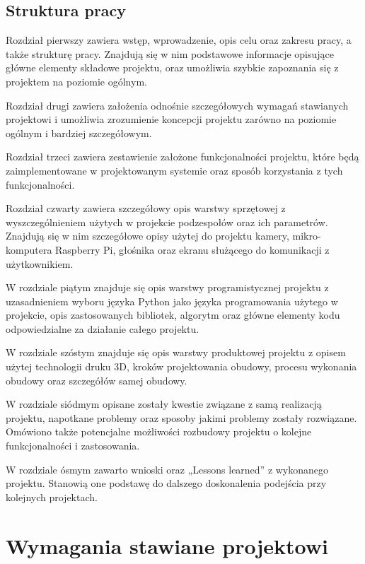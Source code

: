 \documentclass[a4paper,12pt,reqno]{article}
\begin{document}
\subsection{Struktura pracy} %

Rozdział pierwszy zawiera wstęp, wprowadzenie, opis celu oraz zakresu pracy, a także strukturę pracy. Znajdują się w nim podstawowe informacje opisujące główne elementy składowe projektu, oraz umożliwia szybkie zapoznania się z projektem na poziomie ogólnym.

Rozdział drugi zawiera założenia odnośnie szczegółowych wymagań stawianych projektowi i umożliwia zrozumienie koncepcji projektu zarówno na poziomie ogólnym i bardziej szczegółowym.

Rozdział trzeci zawiera zestawienie założone funkcjonalności projektu, które będą zaimplementowane w projektowanym systemie oraz sposób korzystania z tych funkcjonalności.

Rozdział czwarty zawiera szczegółowy opis warstwy sprzętowej z wyszczególnieniem użytych w projekcie podzespołów oraz ich parametrów. Znajdują się w nim szczegółowe opisy użytej do projektu kamery, mikro-komputera Raspberry Pi, głośnika oraz ekranu służącego do komunikacji z użytkownikiem.

W rozdziale piątym znajduje się opis warstwy programistycznej projektu z uzasadnieniem wyboru języka Python jako języka programowania użytego w projekcie, opis zastosowanych bibliotek, algorytm oraz główne elementy kodu odpowiedzialne za działanie całego projektu.

W rozdziale szóstym znajduje się opis warstwy produktowej projektu z opisem użytej technologii druku 3D, kroków projektowania obudowy, procesu wykonania obudowy oraz szczegółów samej obudowy.

W rozdziale siódmym opisane zostały kwestie związane z samą realizacją projektu, napotkane problemy oraz sposoby jakimi problemy zostały rozwiązane. Omówiono także potencjalne możliwości rozbudowy projektu o kolejne funkcjonalności i zastosowania.

W rozdziale ósmym zawarto wnioski oraz „Lessons learned” z wykonanego projektu. Stanowią one podstawę do dalszego doskonalenia podejścia przy kolejnych projektach.

\newpage
\section{Wymagania stawiane projektowi} \label{section:wymagania}
\end{document}
